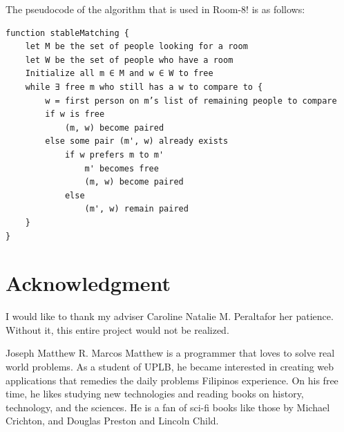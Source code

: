 \documentclass[journal]{./IEEE/IEEEtran}
\newcommand{\ADVISEE}{Joseph Matthew R. Marcos}
\newcommand{\ADVISER}{Caroline Natalie M. Peralta}
\begin{document}
The pseudocode of the algorithm that is used in Room-8! is as follows:
\newpage
\begin{verbatim}
function stableMatching {
    let M be the set of people looking for a room
    let W be the set of people who have a room
    Initialize all m ∈ M and w ∈ W to free
    while ∃ free m who still has a w to compare to {
        w = first person on m’s list of remaining people to compare
        if w is free
            (m, w) become paired
        else some pair (m', w) already exists
            if w prefers m to m'
                m' becomes free
                (m, w) become paired
            else
                (m', w) remain paired
    }
}
\end{verbatim}



\newpage
\section*{Acknowledgment}
I would like to thank my adviser \ADVISER for her patience. Without it, this entire project would not be realized.
\begin{biography}{\ADVISEE}
    Matthew is a programmer that loves to solve real world problems. As a student of UPLB, he became interested in creating
    web applications that remedies the daily problems Filipinos experience. On his free time, he likes studying new
    technologies and reading books on history, technology, and the sciences. He is a fan of sci-fi books like those by
    Michael Crichton, and Douglas Preston and Lincoln Child.
\end{biography}
\end{document}
